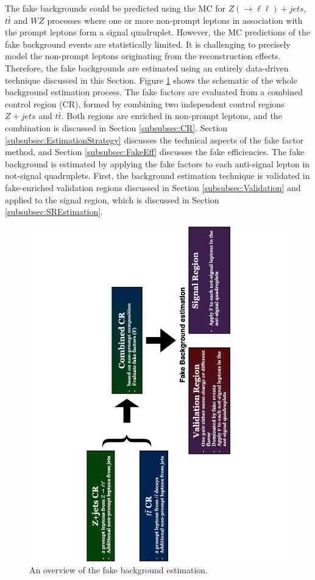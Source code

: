 The fake backgrounds could be predicted using the MC for $Z(\rightarrow \ell \ell) + jets $, $t\bar{t}$ and $WZ$ processes where one or more non-prompt leptons in association with the prompt leptons form a signal quadruplet. However, the MC predictions of the fake background events are statistically limited. It is challenging to precisely model the non-prompt leptons originating from the reconstruction effects. Therefore, the fake backgrounds are estimated using an entirely data-driven technique discussed in this Section. Figure \ref{fig:FakeBkgOverview} shows the schematic of the whole background estimation process. The fake factors are evaluated from a combined control region (CR), formed by combining two independent control regions $Z+jets$ and $t\bar{t}$. Both regions are enriched in non-prompt leptons, and the combination is discussed in Section \ref{subsubsec:CR}. Section \ref{subsubsec:EstimationStrategy} discusses the technical aspects of the fake factor method, and Section \ref{subsubsec:FakeEff} discusses the fake efficiencies. The fake background is estimated by applying the fake factors to each anti-signal lepton in not-signal quadruplets. First, the background estimation technique is validated in fake-enriched validation regions discussed in Section \ref{subsubsec:Validation} and applied to the signal region, which is discussed in Section \ref{subsubsec:SREstimation}. 

\begin{figure}
    \centering
    \includegraphics[width=.8\linewidth, angle =270]{figures/Analysis/Background/FakeBackgroundOverview.pdf}  
    \caption{An overview of the fake background estimation.\label{fig:FakeBkgOverview}}
\end{figure}


